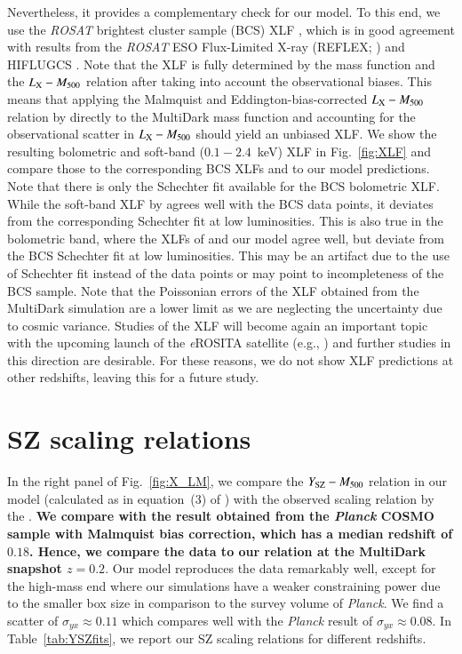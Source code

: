 \documentclass[useAMS,usenatbib]{mn2e}
\begin{document}
Nevertheless, it provides a complementary check for our model. To this end, we
use the \emph{ROSAT} brightest cluster sample (BCS) XLF
\citep{1997ApJ...479L.101E}, which is in good agreement with results from the
\emph{ROSAT} ESO Flux-Limited X-ray (REFLEX; \citealp{2002ApJ...566...93B}) and
HIFLUGCS \citep{2002ApJ...567..716R}.  Note that the XLF is fully determined by
the mass function and the $L_{{\mathrm{X}}}-M_{500}$ relation after taking into
account the observational biases. This means that applying the Malmquist and
Eddington-bias-corrected $L_{{\mathrm{X}}}-M_{500}$ relation by
\cite{2010MNRAS.406.1773M} directly to the MultiDark mass function and
accounting for the observational scatter in $L_{{\mathrm{X}}}-M_{500}$ should yield
an unbiased XLF. We show the resulting bolometric and soft-band ($0.1-2.4$~keV)
XLF in Fig.~\ref{fig:XLF} and compare those to the corresponding BCS XLFs and
to our model predictions. Note that there is only the Schechter fit available
for the BCS bolometric XLF.  While the soft-band XLF by
\cite{2010MNRAS.406.1773M} agrees well with the BCS data points, it deviates
from the corresponding Schechter fit at low luminosities. This is also true in
the bolometric band, where the XLFs of \cite{2010MNRAS.406.1773M} and our model
agree well, but deviate from the BCS Schechter fit at low luminosities. This may
be an artifact due to the use of Schechter fit instead of the data points or may
point to incompleteness of the BCS sample. Note that the Poissonian errors of
the XLF obtained from the MultiDark simulation are a lower limit as we are
neglecting the uncertainty due to cosmic variance.  Studies of the XLF will
become again an important topic with the upcoming launch of the \emph{e}ROSITA
satellite (e.g., \citealp{2011MSAIS..17..159C}) and further studies in this
direction are desirable. For these reasons, we do not show XLF predictions at
other redshifts, leaving this for a future study.


\section{SZ scaling relations}
\label{sec:5}
In the right panel of Fig.~\ref{fig:X_LM}, we compare the
$Y_{{\mathrm{SZ}}}-M_{500}$ relation in our model (calculated as in equation~(3) of
\citealp{2012ApJ...758...74B}) with the observed scaling relation by the
\cite{2013arXiv1303.5080P}. {\bf We compare with the result obtained from the 
\emph{Planck} COSMO sample with Malmquist bias correction,
which has a median redshift of $0.18$. Hence, we compare the data to our relation 
at the MultiDark snapshot $z=0.2$}. Our model reproduces the data remarkably well, except 
for the high-mass end where our simulations have a weaker constraining power due to the 
smaller box size in comparison to the survey volume of {\em Planck}. We find a scatter of
$\sigma_{yx} \approx 0.11$ which compares well with the \emph{Planck} result of
$\sigma_{yx} \approx 0.08$. In Table~\ref{tab:YSZfits}, we report our SZ scaling
relations for different redshifts.
\end{document}
